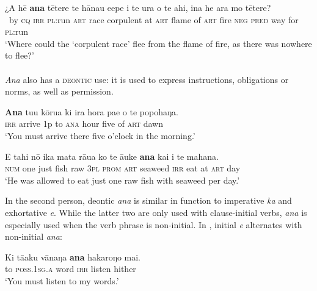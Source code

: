 \ea\label{ex:11.172}
\gll ¿A hē \textbf{ana} tētere te hānau {\ꞌ}e{\ꞌ}epe {\ꞌ}i te ura o te ahi,  {\ꞌ}ina he ara mo tētere?\\
~by \textsc{cq} \textsc{irr} \textsc{pl}:run \textsc{art} race corpulent at \textsc{art} flame of \textsc{art} fire  \textsc{neg} \textsc{pred} way for \textsc{pl}:run\\

\glt 
‘Where could the ‘corpulent race’ flee from the flame of fire, as there was nowhere to flee?’ \textstyleExampleref{[Mtx-3-02.034]}
\z

\paragraph{} \textit{Ana} also has a \textsc{deontic} use: it is used to express instructions, obligations or norms, as well as permission.

\ea\label{ex:11.173}
\gll \textbf{Ana} tu{\ꞌ}u kōrua ki ira hora pae o te popohaŋa. \\
\textsc{irr} arrive 1p to \textsc{ana} hour five of \textsc{art} dawn \\

\glt 
‘You must arrive there five o’clock in the morning.’ \textstyleExampleref{[R310.272]} 
\z

\ea\label{ex:11.174}
\gll E tahi nō ika mata rāua ko te {\ꞌ}āuke \textbf{ana} kai {\ꞌ}i te mahana. \\
\textsc{num} one just fish raw \textsc{3pl} \textsc{prom} \textsc{art} seaweed \textsc{irr} eat at \textsc{art} day \\

\glt
‘He was allowed to eat just one raw fish with seaweed per day.’ \textstyleExampleref{[Fel-40.11]}
\z

In the second person, deontic \textit{ana} is similar in function to imperative \textit{ka} and exhortative \textit{e}. While the latter two are only used with clause-initial verbs, \textit{ana} is especially used when the verb phrase is non-initial. In , initial \textit{e} alternates with non-initial \textit{ana}:

\ea\label{ex:11.175}
\gll Ki tā{\ꞌ}aku vānaŋa \textbf{ana} hakaroŋo mai. \\
to \textsc{poss.1sg.a} word \textsc{irr} listen hither \\

\glt 
‘You must listen to my words.’ \textstyleExampleref{[R229.280]} 
\z

